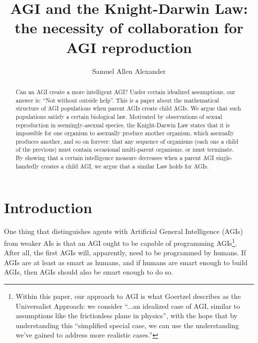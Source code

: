 \documentclass[runningheads]{llncs}
\begin{document}
\title{AGI and the Knight-Darwin Law: the necessity of collaboration for
AGI reproduction}

\author{Samuel Allen Alexander}

\maketitle

\begin{abstract}
Can an AGI create a more intelligent AGI?
Under certain idealized assumptions, our answer is:
``Not without outside help''.
This is a paper about the mathematical structure of AGI populations
when parent AGIs create child AGIs. We argue that such populations
satisfy a certain biological law.
Motivated by observations of sexual reproduction in seemingly-asexual
species,
the Knight-Darwin Law states that it is impossible for one organism
to asexually produce another organism, which asexually produces another,
and so on forever:
that any sequence of organisms (each one a child of the previous) must contain
occasional multi-parent organisms, or must terminate.
By showing that a certain intelligence measure decreases when a parent AGI
single-handedly creates a child AGI,
we argue that a similar Law holds for AGIs.


\end{abstract}

\section{Introduction}

One thing that distinguishes agents with Artificial General Intelligence (AGIs)
from weaker AIs is that an
AGI ought to be capable of programming AGIs\footnote{Within this paper,
our approach to AGI is what Goertzel \cite{goertzel2014artificial} describes
as the Universalist Approach:
we consider ``...an idealized case of AGI, similar to
assumptions like the frictionless plane in physics'', with the hope that by
understanding this ``simplified special
case, we can use the understanding we've gained to address more realistic
cases.''}. After all, the first AGIs will,
apparently, need to be programmed by humans. If AGIs are at least as smart as
humans, and if humans are smart enough to
build AGIs, then AGIs should also be smart enough to do so.
\end{document}
